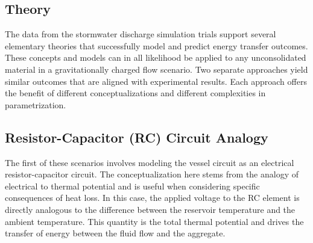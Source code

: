 

\begin{center}
\section{Theory}
\end{center}

The data from the stormwater discharge simulation trials support several elementary theories that successfully model and predict energy transfer outcomes. These concepts and models can in all likelihood be applied to any unconsolidated material in a gravitationally charged flow scenario. Two separate approaches yield similar outcomes that are aligned with experimental results. Each approach offers the benefit of different conceptualizations and different complexities in parametrization. \\

\subsection{Resistor-Capacitor (RC) Circuit Analogy}
The first of these scenarios involves modeling the vessel circuit as an electrical resistor-capacitor circuit. The conceptualization here stems from the analogy of electrical to thermal potential and is useful when considering specific consequences of heat loss. In this case, the applied voltage to the RC element is directly analogous to the difference between the reservoir temperature and the ambient temperature. This quantity is the total thermal potential and drives the transfer of energy between the fluid flow and the aggregate. 

